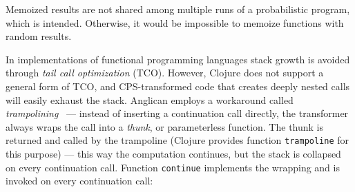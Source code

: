 \documentclass[preprint]{sigplanconf}
\begin{document}
Memoized results are not shared among multiple runs of a
probabilistic program, which is intended. Otherwise, it would be
impossible to memoize functions with random results.

\iftoggle{full}{\subsubsection{Continuations}}{\subsection{Managing stack size}}
\label{seq:continuations}

\iftoggle{full}{
Continuations are functions that are called in tail positions
with the computed value and state as their arguments --- in CPS
there is always a function call in every tail position and never
a value. Continuations are passed to CPS transformers, and when
transformers are called recursively, the continuations are
generated on the fly.

There are two critical issues related to generation of
continuations:
\begin{itemize}
    \item unbounded \textit{stack growth} in recursive code;
    \item code size \textit{explosion} when a non-atomic
        continuation is symbolically substituted in multiple
        locations.
\end{itemize}

\paragraph{Managing stack size}
}{%
Continuations may lead to unbounded stack growth in
recursive code.
}%
In implementations of functional programming languages stack
growth is avoided through \textit{tail call optimization} (TCO).
However, Clojure does not support a general form of TCO, and
CPS-transformed code that creates deeply nested calls will
easily exhaust the stack. Anglican employs a workaround called
\textit{trampolining}~\cite{B95} --- instead of inserting a
continuation call directly, the transformer always wraps the
call into a \textit{thunk}, or parameterless function. The thunk
is returned and called by the trampoline (Clojure provides
function \texttt{trampoline} for this purpose) --- this way the
computation continues, but the stack is collapsed on every
continuation call. Function \texttt{continue} implements the
wrapping and is invoked on every continuation call:
\end{document}
